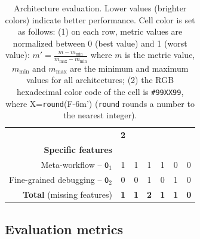 \documentclass[preprint,3p,twocolumn]{elsarticle}
\newcommand{\note}[2]{\pdfmargincomment[color=yellow,author=#1,open=true]{#2}}
\newcommand{\closednote}[4]{} %
\begin{document}
\begin{table}
\begin{tabular}{rcccccc}
                                     & \cellcolor[HTML]{99CC99}\textbf{2}\\
\cellcolor[HTML]{EEEEEE}\textbf{Specific features}& \multicolumn{6}{l}{\cellcolor[HTML]{EEEEEE}}\\
  Meta-workflow  -- \texttt{O$_1$}    & \cellcolor[HTML]{999999}1
                                     & \cellcolor[HTML]{999999}1
                                     & \cellcolor[HTML]{999999}1
                                     & \cellcolor[HTML]{999999}1
                                     & \cellcolor[HTML]{99FF99}0
                                     & \cellcolor[HTML]{99FF99}0\\
  Fine-grained debugging -- \texttt{O$_2$}   & \cellcolor[HTML]{99FF99}0
                                     & \cellcolor[HTML]{99FF99}0
                                     & \cellcolor[HTML]{999999}1
                                     & \cellcolor[HTML]{99FF99}0
                                     & \cellcolor[HTML]{999999}1
                                     & \cellcolor[HTML]{99FF99}0\\
  \textbf{Total} (missing features) & \cellcolor[HTML]{99CC99}\textbf{1}
                                     & \cellcolor[HTML]{99CC99}\textbf{1}
                                     & \cellcolor[HTML]{999999}\textbf{2}
                                     & \cellcolor[HTML]{99CC99}\textbf{1}
                                     & \cellcolor[HTML]{99CC99}\textbf{1}
                                     & \cellcolor[HTML]{99FF99}\textbf{0}\\
\end{tabular}

\caption{Architecture evaluation. Lower values (brighter colors) indicate better performance. Cell color is set as follows: (1) on each row, metric values are
  normalized between 0 (best value) and 1 (worst value):
  $m'=\frac{m-m_{\mathrm{min}}}{m_{\mathrm{max}}-m_{\mathrm{min}}}$ where
  $m$ is the metric value, $m_{\mathrm{min}}$ and $m_{\mathrm{max}}$
  are the minimum and maximum values for all architectures; (2) the RGB hexadecimal color code of the cell
  is \texttt{\#99XX99}, where X=\texttt{round}(F-6m') (\texttt{round} rounds a number to the nearest integer). \closednote{Tristan}{Use 6. Round to the nearest integer.}{Tristan}{Fixed.}}
\label{table:evaluation}
\end{table}

\subsection{Evaluation metrics}
\end{document}
